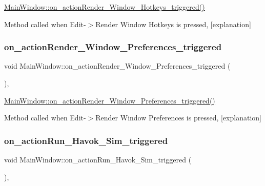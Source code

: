 \hyperlink{class_main_window_a06cab8e06cb83d2e79c4bdd0e0cd5a88}{Main\+Window\+::on\+\_\+action\+Render\+\_\+\+Window\+\_\+\+Hotkeys\+\_\+triggered()} 

Method called when Edit-\/$>$Render Window Hotkeys is pressed, \mbox{[}explanation\mbox{]} \mbox{\label{class_main_window_a0361ab994394a05a31374b9e5b873d3b}} 
\subsubsection{\texorpdfstring{on\+\_\+action\+Render\+\_\+\+Window\+\_\+\+Preferences\+\_\+triggered}{on\_actionRender\_Window\_Preferences\_triggered}}
{\footnotesize\ttfamily void Main\+Window\+::on\+\_\+action\+Render\+\_\+\+Window\+\_\+\+Preferences\+\_\+triggered (\begin{DoxyParamCaption}{ }\end{DoxyParamCaption})\hspace{0.3cm}{\ttfamily [private]}, {\ttfamily [slot]}}



\hyperlink{class_main_window_a0361ab994394a05a31374b9e5b873d3b}{Main\+Window\+::on\+\_\+action\+Render\+\_\+\+Window\+\_\+\+Preferences\+\_\+triggered()} 

Method called when Edit-\/$>$Render Window Preferences is pressed, \mbox{[}explanation\mbox{]} \mbox{\label{class_main_window_ac9c08be5071382e5c549eaa3d5d9ccaf}} 
\subsubsection{\texorpdfstring{on\+\_\+action\+Run\+\_\+\+Havok\+\_\+\+Sim\+\_\+triggered}{on\_actionRun\_Havok\_Sim\_triggered}}
{\footnotesize\ttfamily void Main\+Window\+::on\+\_\+action\+Run\+\_\+\+Havok\+\_\+\+Sim\+\_\+triggered (\begin{DoxyParamCaption}{ }\end{DoxyParamCaption})\hspace{0.3cm}{\ttfamily [private]}, {\ttfamily [slot]}}



